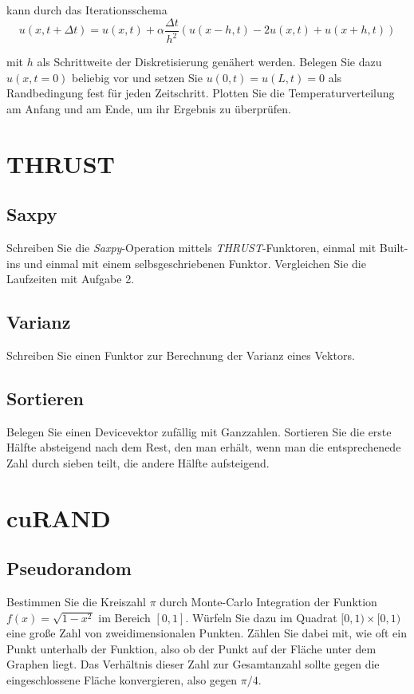 \documentclass[headsepline=3pt,headinclude=true,12pt,oneside]{scrartcl}
\begin{document}
	kann durch das Iterationsschema
	\begin{equation}\label{tps}
		u(x,t + \Delta t) = u(x,t) + \alpha \frac{\Delta t}{h^2}(u(x-h,t)-2u(x,t)+u(x+h,t))
	\end{equation}
	
	mit $h$ als Schrittweite der Diskretisierung genähert werden. Belegen Sie dazu $u(x,t=0)$ beliebig vor und setzen Sie $u(0,t)=u(L,t)=0$ als Randbedingung fest für jeden Zeitschritt. Plotten Sie die Temperaturverteilung am Anfang und am Ende, um ihr Ergebnis zu überprüfen.	
		
	\section{THRUST}
		\subsection{Saxpy}
		Schreiben Sie die \textit{Saxpy}-Operation mittels \textit{THRUST}-Funktoren, einmal mit Built-ins und einmal mit einem selbsgeschriebenen Funktor. Vergleichen Sie die Laufzeiten mit Aufgabe 2.
		
		\subsection{Varianz}
		Schreiben Sie einen Funktor zur Berechnung der Varianz eines Vektors.		
		
		\subsection{Sortieren}
		Belegen Sie einen Devicevektor zufällig mit Ganzzahlen. Sortieren Sie die erste Hälfte absteigend nach dem Rest, den man erhält, wenn man die entsprechenede Zahl durch sieben teilt, die andere Hälfte aufsteigend. 
			
			
		\section{cuRAND}
			\subsection{Pseudorandom}
			Bestimmen Sie die Kreiszahl $\pi$ durch Monte-Carlo Integration der Funktion $f(x) = \sqrt{1-x^2}$ im Bereich $[0,1]$. Würfeln Sie dazu im Quadrat $[0,1)\times[0,1)$ eine große Zahl von zweidimensionalen Punkten. Zählen Sie dabei mit, wie oft ein Punkt unterhalb der Funktion, also ob der Punkt auf der Fläche unter dem Graphen liegt. Das Verhältnis dieser Zahl zur Gesamtanzahl sollte gegen die eingeschlossene Fläche konvergieren, also gegen $\pi/4$.
\end{document}
